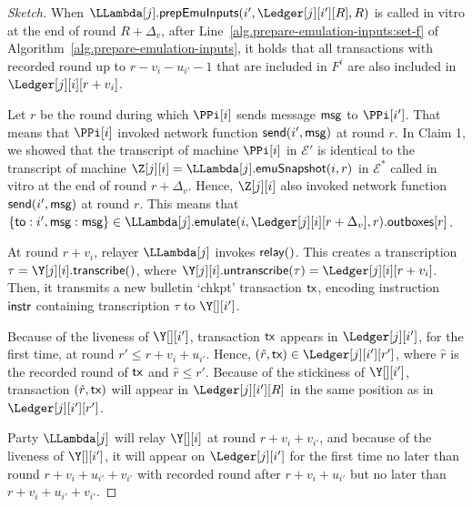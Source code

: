 \begin{proof}[Sketch]
  When $\LLambda[j].\prepareEmulationInputs(i', \Ledger[j][i'][R], R)$ is called in vitro
  at the end of round $R + \Delta_v$, after Line~\ref{alg.prepare-emulation-inputs:set-f} of Algorithm~\ref{alg.prepare-emulation-inputs},
  it holds that all transactions with recorded round up to $r - v_i - u_{i'} - 1$ that are included in $F^{i}$ are also included in $\Ledger[j][i][r + v_i]$.


  Let $r$ be the round during which $\PPi[i]$ sends message $\textsf{msg}$ to $\PPi[i']$.
  That means that $\PPi[i]$ invoked network function $\textsf{send}(i', \textsf{msg})$ at round $r$.
  In Claim 1, we showed that the transcript of machine $\PPi[i]$ in $\mathcal{E}'$
  is identical to the transcript of machine $\Z[j][i] = \LLambda[j].\emulationSnapshot(i,r)$ in $\mathcal{E}^*$
  called in vitro at the end of round $r + \Delta_v$.
  Hence, $\Z[j][i]$ also invoked network function $\textsf{send}(i', \textsf{msg})$ at round $r$.
  This means that $\{\textsf{to}: i', \msg: \msg\} \in \LLambda[j].\emulate(i, \Ledger[j][i][r + \Delta_v], r).\outboxes[r]$.




  At round $r + v_i$, relayer $\LLambda[j]$ invokes $\textsf{relay}()$.
  This creates a transcription $\tau = \Y[j][i].\transcribe()$, where
  $\Y[j][i].\untranscribe(\tau) = \Ledger[j][i][r + v_i]$.
  Then, it transmits a new bulletin `chkpt'
  transaction $\textsf{tx}$, encoding instruction $\textsf{instr}$ containing transcription $\tau$ to $\Y[][i']$.

  Because of the liveness of $\Y[][i']$,
  transaction $\textsf{tx}$ appears in $\Ledger[j][i']$, for the first time,
  at round $r' \leq r + v_i + u_{i'}$.
  Hence, $(\hat{r}, \tx) \in \Ledger[j][i'][r']$, where $\hat{r}$ is the recorded round of $\textsf{tx}$
  and $\hat{r} \leq r'$. Because of the stickiness of $\Y[][i']$, transaction $(\hat{r}, \textsf{tx})$ will
  appear in $\Ledger[j][i'][R]$ in the same position as in $\Ledger[j][i'][r']$.

  Party $\LLambda[j]$ will relay $\Y[][i]$ at round $r + v_i + v_{i'}$, and
  because of the liveness of $\Y[][i']$, it will appear on $\Ledger[j][i']$ for the
  first time no later than round $r + v_i + u_{i'} + v_{i'}$ with recorded round
  after $r + v_i + u_{i'}$ but no later than $r + v_i + u_{i'} + v_{i'}$.


\end{proof}
